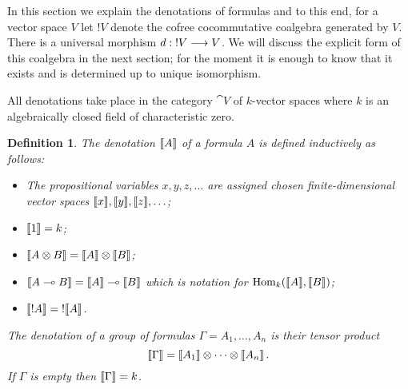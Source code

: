 \documentclass[english,letter paper,12pt,reqno]{article}
\theoremstyle{example}
\newtheorem{definition}[theorem]{Definition}
\newtheorem{remark}[theorem]{Remark}
\numberwithin{equation}{section}
\def\Hom{\operatorname{Hom}}
\DeclareMathOperator{\End}{End}
\begin{document}
In this section we explain the denotations of formulas and to this end, for a vector space $V$ let ${!} V$ denote the cofree cocommutative coalgebra generated by $V$. There is a universal morphism $d: {!} V \longrightarrow V$. We will discuss the explicit form of this coalgebra in the next section; for the moment it is enough to know that it exists and is determined up to unique isomorphism.

All denotations take place in the category $\cat{V}$ of $k$-vector spaces where $k$ is an algebraically closed field of characteristic zero. 

\begin{definition}\label{defn:denotation_objects} The \emph{denotation} $\llbracket A \rrbracket$ of a formula $A$ is defined inductively as follows:
\begin{itemize}
\item The propositional variables $x, y, z, \ldots$ are assigned chosen finite-dimensional vector spaces $\llbracket x \rrbracket, \llbracket y \rrbracket, \llbracket z \rrbracket, \ldots$;
\item $\llbracket 1 \rrbracket = k$;
\item $\llbracket A \otimes B \rrbracket = \llbracket A \rrbracket \otimes \llbracket B \rrbracket$;
\item $\llbracket A \multimap B \rrbracket = \llbracket A \rrbracket \multimap \llbracket B \rrbracket$ which is notation for $\Hom_k(\den{A}, \den{B})$;
\item $\llbracket !A \rrbracket = {!} \llbracket A \rrbracket$.
\end{itemize}
The denotation of a group of formulas $\Gamma = A_1,\ldots,A_n$ is their tensor product
\[
\llbracket \Gamma \rrbracket = \llbracket A_1 \rrbracket \otimes \cdots \otimes \llbracket A_n \rrbracket\,.
\]
If $\Gamma$ is empty then $\llbracket \Gamma \rrbracket = k$.
\end{definition}


\end{document}
